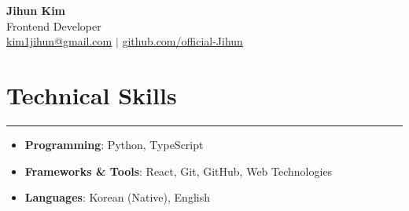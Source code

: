 \documentclass[letterpaper,10pt]{article}
\begin{document}
\begin{center}
    \textbf{\LARGE Jihun Kim} \\ \vspace{2pt}
    Frontend Developer \\ \vspace{2pt}
    \href{mailto:kim1jihun@gmail.com}{\underline{kim1jihun@gmail.com}} $|$
    \href{https://github.com/official-Jihun}{\underline{github.com/official-Jihun}}
\end{center}

\section*{Technical Skills}
\hrule
\vspace{4pt}
\begin{itemize}
    \item[] \textbf{Programming}: Python, TypeScript
    \item[] \textbf{Frameworks \& Tools}: React, Git, GitHub, Web Technologies
    \item[] \textbf{Languages}: Korean (Native), English
\end{itemize}

\end{document}
